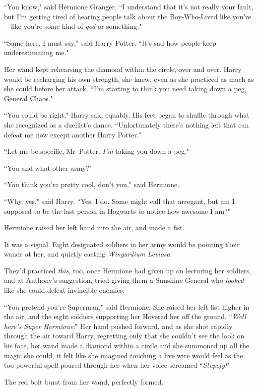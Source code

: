 ``You know," said Hermione Granger, ``I understand that it's not really your fault, but I'm getting tired of hearing people talk about the Boy-Who-Lived like you're—like you're some kind of \emph{god} or something."

``Same here, I must say," said Harry Potter. ``It's sad how people keep underestimating me."

Her wand kept rehearsing the diamond within the circle, over and over. Harry would be recharging his own strength, she knew, even as she practiced as much as she could before her attack. ``I'm starting to think you need taking down a peg, General Chaos."

``You could be right," Harry said equably. His feet began to shuffle through what she recognized as a duellist's dance. ``Unfortunately there's nothing left that can defeat me now except another Harry Potter."

``Let me be specific, Mr~Potter. \emph{I'm} taking you down a peg."

``You and what other army?"

``You think you're pretty cool, don't you," said Hermione.

``Why, yes," said Harry. ``Yes, I do. Some might call that arrogant, but am I supposed to be the last person in Hogwarts to notice how awesome I am?"

Hermione raised her left hand into the air, and made a fist.

It was a signal. Eight designated soldiers in her army would be pointing their wands at her, and quietly casting \emph{Wingardium Leviosa}.

They'd practiced \emph{this}, too, once Hermione had given up on lecturing her soldiers, and at Anthony's suggestion, tried giving them a Sunshine General who \emph{looked} like she could defeat invincible enemies.

``You pretend you're Superman," said Hermione. She raised her left fist higher in the air, and the eight soldiers supporting her Hovered her off the ground. ``\emph{Well here's Super Hermione!}" Her hand pushed forward, and as she shot rapidly through the air toward Harry, regretting only that she couldn't see the look on his face, her wand made a diamond within a circle and she summoned up all the magic she could, it felt like she imagined touching a live wire would feel as the too-powerful spell poured through her when her voice screamed ``\emph{Stupefy!}"

The red bolt burst from her wand, perfectly formed.

